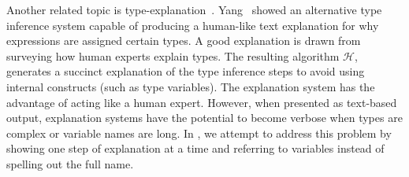 
Another related topic is type-explanation~\cite{yang1999explaining, jun2002explaining}. Yang~\cite{jun2002explaining} showed an alternative type inference system capable of producing a human-like text explanation for why expressions are assigned certain types. A good explanation is drawn from surveying how human experts explain types. The resulting algorithm $\mathcal{H}$, generates a succinct explanation of the type inference steps to avoid using internal constructs (such as type variables). The explanation system has the advantage of acting like a human expert. However, when presented as text-based output, explanation systems have the potential to become verbose when types are complex or variable names are long. In \chameleon{}, we attempt to address this problem by showing one step of explanation at a time and referring to variables instead of spelling out the full name.






